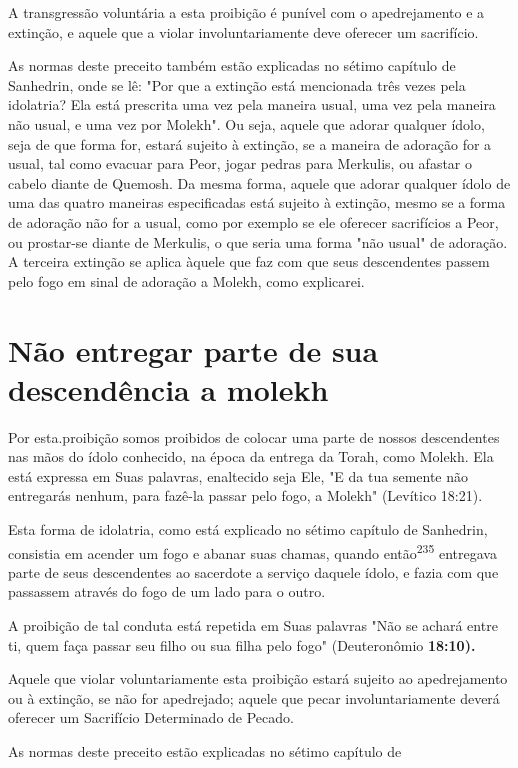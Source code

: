 \begin{itemize}
\begin{enumrate}
\begin{itemize}
\begin{itemize}
\begin{itemize}
A transgressão voluntária a esta proibição é punível com o
apedreja­mento e a extinção, e aquele que a violar involuntariamente
deve oferecer um sacrifício.

As normas deste preceito também estão explicadas no sétimo capí­tulo de
Sanhedrin, onde se lê: "Por que a extinção está mencionada três vezes
pela idolatria? Ela está prescrita uma vez pela maneira usual, uma vez
pela ma­neira não usual, e uma vez por Molekh". Ou seja, aquele que
adorar qualquer ídolo, seja de que forma for, estará sujeito à extinção,
se a maneira de adoração for a usual, tal como evacuar para Peor, jogar
pedras para Merkulis, ou afastar o cabelo diante de Quemosh. Da mesma
forma, aquele que adorar qualquer ídolo de uma das quatro maneiras
especificadas está sujeito à extinção, mesmo se a forma de adoração não
for a usual, como por exemplo se ele oferecer sacri­fícios a Peor, ou
prostar-se diante de Merkulis, o que seria uma forma "não usual" de
adoração. A terceira extinção se aplica àquele que faz com que seus
descen­dentes passem pelo fogo em sinal de adoração a Molekh, como
explicarei.

\section{Não entregar parte de sua descendência a molekh}

Por esta.proibição somos proibidos de colocar uma parte de nossos
descendentes nas mãos do ídolo conhecido, na época da entrega da Torah,
co­mo Molekh. Ela está expressa em Suas palavras, enaltecido seja Ele,
"E da tua semente não entregarás nenhum, para fazê-la passar pelo fogo,
a Molekh" (Le­vítico 18:21).

Esta forma de idolatria, como está explicado no sétimo capítulo de
Sanhedrin, consistia em acender um fogo e abanar suas chamas, quando
então\textsuperscript{235} entregava parte de seus descendentes ao
sacerdote a serviço daquele ídolo, e fazia com que passassem através do
fogo de um lado para o outro.

A proibição de tal conduta está repetida em Suas palavras "Não se achará
entre ti, quem faça passar seu filho ou sua filha pelo fogo"
(Deuteronô­mio \textbf{18:10).}

Aquele que violar voluntariamente esta proibição estará sujeito ao
apedrejamento ou à extinção, se não for apedrejado; aquele que pecar
involun­tariamente deverá oferecer um Sacrifício Determinado de Pecado.

As normas deste preceito estão explicadas no sétimo capítulo de


\end{itemize}
\end{itemize}
\end{itemize}
\end{enumrate}
\end{itemize}
